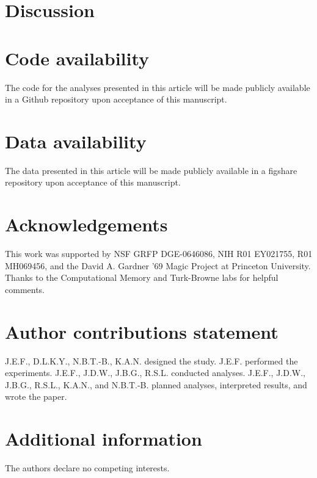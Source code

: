 \documentclass[11pt,letterpaper]{article}
\begin{document}
\section*{Discussion}

\section*{Code availability} The code for the analyses presented in this article will be made publicly available in a Github repository upon acceptance of this manuscript.

\section*{Data availability} The data presented in this article will be made publicly available in a figshare repository upon acceptance of this manuscript.

\section*{Acknowledgements}

This work was supported by NSF GRFP DGE-0646086, NIH R01 EY021755, R01 MH069456, and the David A. Gardner '69 Magic Project at Princeton University. Thanks to the Computational Memory and Turk-Browne labs for helpful comments.

\section*{Author contributions statement}

J.E.F., D.L.K.Y., N.B.T.-B., K.A.N. designed the study. J.E.F. performed the experiments. J.E.F., J.D.W., J.B.G., R.S.L. conducted analyses. J.E.F., J.D.W., J.B.G., R.S.L., K.A.N., and N.B.T.-B. planned analyses, interpreted results, and wrote the paper.

\section*{Additional information}

The authors declare no competing interests.



\setlength{\bibleftmargin}{.125in}
\setlength{\bibindent}{-\bibleftmargin}

\newpage

\end{document}
